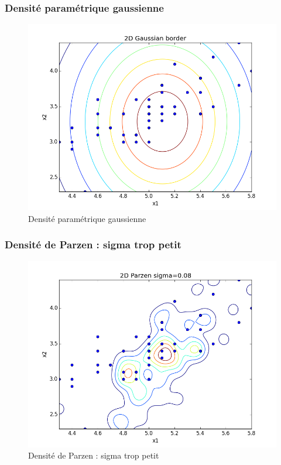 \documentclass[a4paper,10pt]{article}
\begin{document}
\subsubsection{Densité paramétrique gaussienne}
\begin{figure}[H]
	\includegraphics[width=12cm]{images/2D_Gaussian_border.png} 
	\centering
	\caption{Densité paramétrique gaussienne}
	\label{fig:comp}
\end{figure}

\subsubsection{Densité de Parzen : sigma trop petit}
\begin{figure}[H]
	\includegraphics[width=12cm]{images/2D_Parzen_sigma_petit.png} 
	\centering
	\caption{Densité de Parzen : sigma trop petit}
	\label{fig:comp}
\end{figure}
\end{document}

